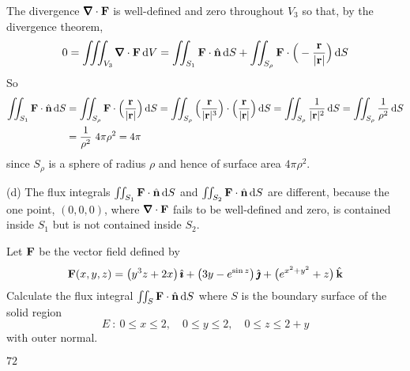 \begin{solution}
\begin{itemize}
\end{itemize}
The divergence $\vnabla\cdot\vF$ is well-defined and zero throughout $V_3$ 
so that, by the divergence theorem,
\begin{align*}
0=\tripInt_{V_3} \vnabla\cdot\vF\,\dee{V}
=\dblInt_{S_1} \vF\cdot\hn\,\dee{S} 
 +\dblInt_{S_\rho} \vF\cdot\Big(-\frac{\vr}{|\vr|}\Big)\,\dee{S}
\end{align*}
So
\begin{align*}
\iint_{S_1} \mathbf{F}\cdot\hat{\mathbf{n}}\,\mathrm{d}S
&=\iint_{S_\rho} \mathbf{F}\cdot\Big(\frac{\mathbf{r}}{|\mathbf{r}|}\Big)\,\mathrm{d}S
=\iint_{S_\rho} \Big(\frac{\mathbf{r}}{|\mathbf{r}|^3}\Big)\cdot\Big(\frac{\mathbf{r}}{|\mathbf{r}|}\Big)\,\mathrm{d}S
=\iint_{S_\rho} \frac{1}{|\mathbf{r}|^2}\,\mathrm{d}S
=\iint_{S_\rho} \frac{1}{\rho^2}\,\mathrm{d}S \\
&=\frac{1}{\rho^2}\ 4\pi\rho^2=4\pi
\end{align*}
since $S_\rho$ is a sphere of radius $\rho$ and hence of surface area $4\pi\rho^2$.

(d) The flux integrals $\iint_{S_1} \mathbf{F}\cdot\hat{\mathbf{n}}\,\mathrm{d}S$ and
$\iint_{S_2} \mathbf{F}\cdot\hat{\mathbf{n}}\,\mathrm{d}S$ are different, because the one point,
$(0,0,0)$, where $\vnabla\cdot\vF$ fails to be well-defined and zero,
is contained inside $S_1$ but is not contained inside $S_2$.
\end{solution}

\begin{question}[M317 2016D] %
Let $\mathbf{F}$ be the vector field defined by
\begin{equation*}
\mathbf{F}(x,y, z) = \big(y^3 z + 2x\big)\,\hat{\pmb{\imath}} 
             +\big(3y - e^{\sin z}\big)\,\hat{\pmb{\jmath}} + \big(e^{x^2+y^2}+ z\big)\,\hat{\mathbf{k}}
\end{equation*}
Calculate the flux integral $\iint_S \mathbf{F}\cdot\hat{\mathbf{n}}\,\mathrm{d}S$
where $S$ is the boundary surface of the solid region
\begin{equation*}
E\ :\ 
0 \le x \le 2,\quad
0 \le y \le 2,\quad
0 \le z \le 2+ y
\end{equation*}
with outer normal.
\end{question}

%

\begin{answer} 
$72$
\end{answer}

